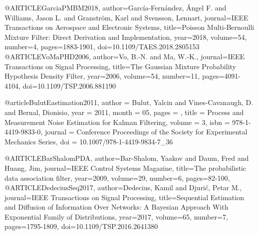 @ARTICLE{GarciaPMBM2018,
author={García-Fernández, Ángel F. and Williams, Jason L. and Granström, Karl and Svensson, Lennart},
journal={IEEE Transactions on Aerospace and Electronic Systems},
title={Poisson Multi-{B}ernoulli Mixture Filter: Direct Derivation and Implementation},
year={2018},
volume={54},
number={4},
pages={1883-1901},
doi={10.1109/TAES.2018.2805153}}
@ARTICLE{VoMaPHD2006,
author={Vo, B.-N. and Ma, W.-K.},
journal={IEEE Transactions on Signal Processing},
title={The {G}aussian Mixture Probability Hypothesis Density Filter},
year={2006},
volume={54},
number={11},
pages={4091-4104},
doi={10.1109/TSP.2006.881190}}


@article{BulutEastimation2011,
author = {Bulut, Yalcin and Vines-Cavanaugh, D. and Bernal, Dionisio},
year = {2011},
month = {05},
pages = {},
title = {Process and Measurement Noise Estimation for {K}alman Filtering},
volume = {3},
isbn = {978-1-4419-9833-0},
journal = {Conference Proceedings of the Society for Experimental Mechanics Series},
doi = {10.1007/978-1-4419-9834-7_36}
}

@ARTICLE{BarShalomPDA,
author={Bar-Shalom, Yaakov and Daum, Fred and Huang, Jim},
journal={IEEE Control Systems Magazine},
title={The probabilistic data association filter},
year={2009},
volume={29},
number={6},
pages={82-100},
}
@ARTICLE{DedeciusSeq2017,
author={Dedecius, Kamil and Djurić, Petar M.},
journal={IEEE Transactions on Signal Processing},
title={Sequential Estimation and Diffusion of Information Over Networks: A {B}ayesian Approach With Exponential Family of Distributions},
year={2017},
volume={65},
number={7},
pages={1795-1809},
doi={10.1109/TSP.2016.2641380}}

